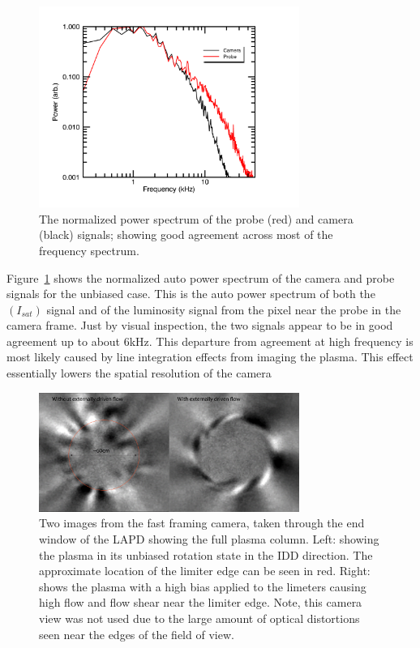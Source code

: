 \documentclass[%
 reprint,
 amsmath,amssymb,
 aps,
]{revtex4-1}
\begin{document}
\begin{figure}[!htbp]
\centerline{}
\includegraphics[width=8.5cm]{plot_Freq_spectra_cam_probe_bias_0V_23cm}
\caption{\label{fig:plot_Freq_spectra_cam_probe_bias_0V_23cm}The normalized power spectrum of the probe (red) and camera (black) signals; showing good agreement across most of the frequency spectrum. }
\end{figure}

Figure~\ref{fig:plot_Freq_spectra_cam_probe_bias_0V_23cm} shows the normalized auto power spectrum of the camera and probe signals for the unbiased case. This is the auto power spectrum of both the $(I_{sat})$ signal and of the luminosity signal from the pixel near the probe in the camera frame. Just by visual inspection, the two signals appear to be in good agreement up to about 6kHz.  This departure from agreement at high frequency is most likely caused by line integration effects from imaging the plasma. This effect essentially lowers the spatial resolution of the camera 


\begin{figure}[!htbp]
\centerline{}
\includegraphics[width=8.5cm]{plot_camera_images_flow}
\caption{\label{fig:plot_camera_images_flow}Two images from the fast framing camera, taken through the end window of the LAPD showing the full plasma column. Left: showing the plasma in its unbiased rotation state in the IDD direction.  The approximate location of the limiter edge can be seen in red.  Right: shows the plasma with a high bias applied to the limeters causing high flow and flow shear near the limiter edge.  Note, this camera view was not used due to the large amount of optical distortions seen near the edges of the field of view.}
\end{figure}
\end{document}
